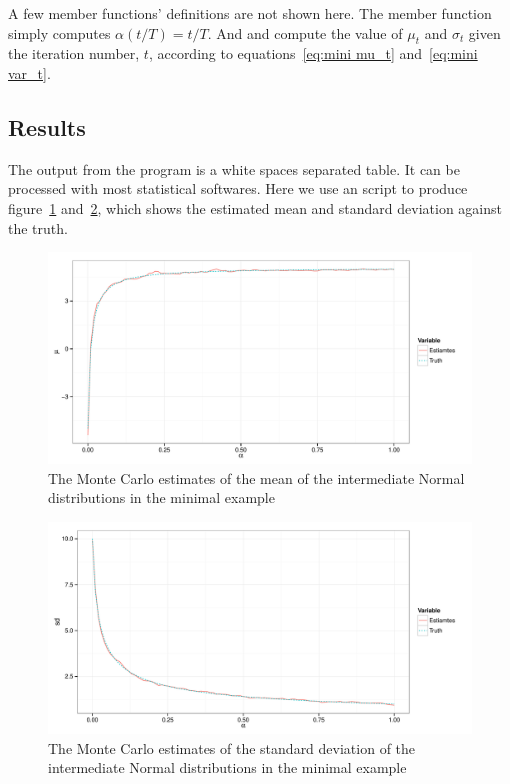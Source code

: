 A few member functions' definitions are not shown here. The member function
 simply computes $\alpha(t/T) = t/T$. And  and
 compute the value of $\mu_t$ and $\sigma_t$ given the iteration
number, $t$, according to equations~\eqref{eq:mini mu_t} and~\eqref{eq:mini
  var_t}.

\subsection{Results}
\label{sub:Results}

The output from the program is a white spaces separated table. It can be
processed with most statistical softwares. Here we use an \rlang script to
produce figure~\ref{fig:mini mean} and~\ref{fig:mini var}, which shows the
estimated mean and standard deviation against the truth.

\begin{figure}
  \includegraphics[width=\linewidth]{fig/mini_mu}
  \caption{The Monte Carlo estimates of the mean of the intermediate Normal
    distributions in the minimal example}
  \label{fig:mini mean}
\end{figure}

\begin{figure}
  \includegraphics[width=\linewidth]{fig/mini_sd}
  \caption{The Monte Carlo estimates of the standard deviation of the
    intermediate Normal distributions in the minimal example}
  \label{fig:mini var}
\end{figure}

